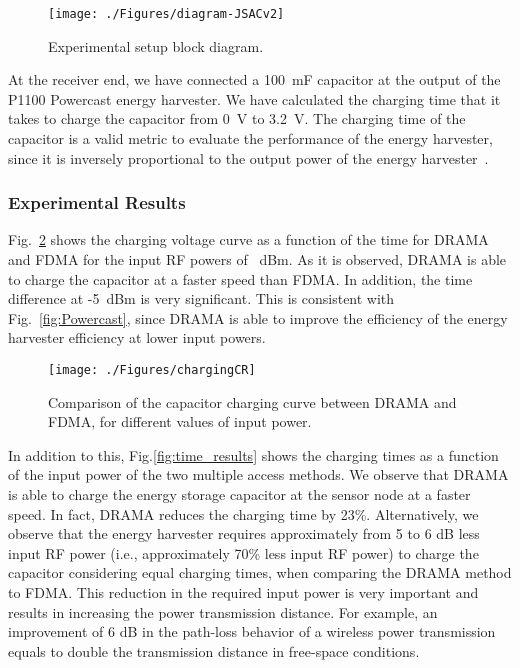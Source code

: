 \documentclass[conference]{IEEEtran}
\begin{document}
\begin{figure}
  \centering
    \texttt{[image: ./Figures/diagram-JSACv2]}
 \caption{Experimental setup block diagram.}
 \label{fig:blockdiagram}
 \vspace{0.0 cm}
\end{figure}

At the receiver end, we have connected a 100~mF capacitor at the output of the P1100 Powercast energy harvester. We have calculated the charging time that it takes to charge the capacitor from 0~V to 3.2~V.
The charging time of the capacitor is a valid metric to evaluate the performance of the energy harvester, since it is inversely proportional to the output power of the energy harvester~\cite{kaushik-routing}. 


\subsubsection{Experimental Results}
 Fig.~\ref{fig:chargefigure} shows the charging voltage curve as a function of the time for DRAMA and FDMA for the input RF powers of ~dBm. 
As it is observed, DRAMA is able to charge the capacitor at a faster speed than FDMA. In addition, the time difference at -5~dBm is very significant. This is consistent with Fig.~\ref{fig:Powercast}, since DRAMA is able to improve the efficiency of the energy harvester efficiency at lower input powers.


\begin{figure}
  \centering
    \texttt{[image: ./Figures/chargingCR]}
 \caption{Comparison of the capacitor charging curve between DRAMA and FDMA, for different values of input power.}
 \label{fig:chargefigure}
 \vspace{0.0 cm}
\end{figure}

In addition to this, Fig.\ref{fig:time_results} shows the charging times as a function of the input power of the two multiple access methods. 
We observe that DRAMA is able to charge the energy storage capacitor at the sensor node at a faster speed. In fact, DRAMA reduces the charging time by 23\%. Alternatively, we observe that the energy harvester requires approximately from 5 to 6 dB less input RF power (i.e., approximately 70\% less input RF power) to charge the capacitor considering equal charging times, when comparing the DRAMA method to FDMA. This reduction in the required input power is very important and results in increasing the power transmission distance. For example, an improvement of 6 dB in the path-loss behavior of a wireless power transmission equals to double the transmission distance in free-space conditions.
\end{document}
